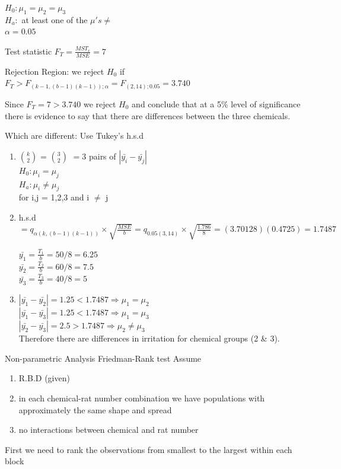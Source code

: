 \documentclass{article}
\begin{document}
\begin{enumerate}[1.]
$H_0: \mu_1 = \mu_2 = \mu_3$ \\
$H_a:$ at least one of the $\mu's \neq$ \\
$\alpha = 0.05$

Test statistic $F_T = \frac{MST_r}{MSE} = 7$

Rejection Region: we reject $H_0$ if $F_T > F_{(k-1, (b-1)(k-1));\alpha} = F_{(2, 14);0.05} = 3.740$

Since $F_T =7 > 3.740$ we reject $H_0$ and conclude that at a 5\% level of significance there is evidence to say that there are differences between the three chemicals.

Which are different: Use Tukey's h.s.d

\begin{enumerate}[1)]

\item $k \choose 2 $ = $3 \choose 2$ $= 3$ pairs of $|\bar{y_i} - \bar{y_j}|$ \\
$H_0: \mu_i = \mu_j$ \\
$H_a: \mu_i \neq \mu_j$ \\
for i,j = 1,2,3 and i $\neq$ j

\item h.s.d $ = q_{\alpha(k ,(b-1)(k-1))} \times \sqrt{ \frac{MSE}{b} } = q_{0.05(3, 14)} \times \sqrt{ \frac{1.786}{8}} = (3.70128)(0.4725) = 1.7487 $

$\bar{y_1} = \frac{T_1}{b} = 50/8 = 6.25$\\
$\bar{y_2} = \frac{T_2}{b} = 60/8 = 7.5$\\
$\bar{y_3} = \frac{T_3}{b} = 40/8 = 5$

\item $| \bar{y_1} - \bar{y_2} | = 1.25 < 1.7487 \Rightarrow \mu_1 = \mu_2$ \\
$| \bar{y_1} - \bar{y_3} | = 1.25 < 1.7487 \Rightarrow \mu_1 = \mu_3$ \\
$| \bar{y_2} - \bar{y_3} | = 2.5 > 1.7487 \Rightarrow \mu_2 \neq \mu_3$ \\

Therefore there are differences in irritation for chemical groups (2 \& 3).

\end{enumerate}

Non-parametric Analysis Friedman-Rank test
Assume 
\begin{enumerate}[1)]
\item R.B.D (given)
\item in each chemical-rat number combination we have populations with approximately the same shape and spread
\item no interactions between chemical and rat number
\end{enumerate}

First we need to rank the observations from smallest to the largest within each block


\end{enumerate}
\end{document}
